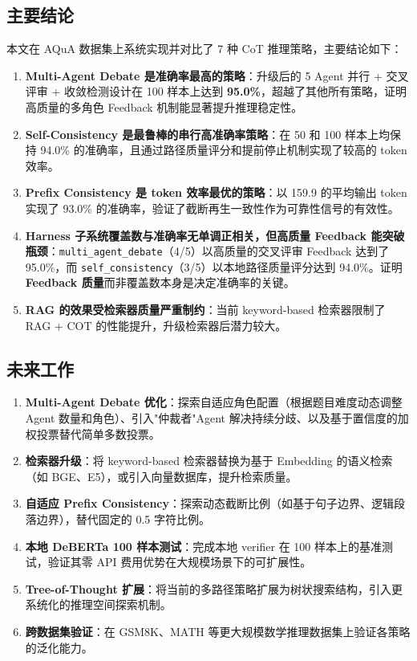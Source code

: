 \documentclass[lang=cn,a4paper,newtx]{elegantpaper}
\begin{document}
\subsection{主要结论}

本文在 AQuA 数据集上系统实现并对比了 7 种 CoT 推理策略，主要结论如下：

\begin{enumerate}
  \item \textbf{Multi-Agent Debate 是准确率最高的策略}：升级后的 5 Agent 并行 + 交叉评审 + 收敛检测设计在 100 样本上达到 \textbf{95.0\%}，超越了其他所有策略，证明高质量的多角色 Feedback 机制能显著提升推理稳定性。
  \item \textbf{Self-Consistency 是最鲁棒的串行高准确率策略}：在 50 和 100 样本上均保持 94.0\% 的准确率，且通过路径质量评分和提前停止机制实现了较高的 token 效率。
  \item \textbf{Prefix Consistency 是 token 效率最优的策略}：以 159.9 的平均输出 token 实现了 93.0\% 的准确率，验证了截断再生一致性作为可靠性信号的有效性。
  \item \textbf{Harness 子系统覆盖数与准确率无单调正相关，但高质量 Feedback 能突破瓶颈}：\texttt{multi\_agent\_debate}（4/5）以高质量的交叉评审 Feedback 达到了 95.0\%，而 \texttt{self\_consistency}（3/5）以本地路径质量评分达到 94.0\%。证明\textbf{Feedback 质量}而非覆盖数本身是决定准确率的关键。
  \item \textbf{RAG 的效果受检索器质量严重制约}：当前 keyword-based 检索器限制了 RAG + COT 的性能提升，升级检索器后潜力较大。
\end{enumerate}

\subsection{未来工作}

\begin{enumerate}
  \item \textbf{Multi-Agent Debate 优化}：探索自适应角色配置（根据题目难度动态调整 Agent 数量和角色）、引入"仲裁者"Agent 解决持续分歧、以及基于置信度的加权投票替代简单多数投票。
  \item \textbf{检索器升级}：将 keyword-based 检索器替换为基于 Embedding 的语义检索（如 BGE、E5），或引入向量数据库，提升检索质量。
  \item \textbf{自适应 Prefix Consistency}：探索动态截断比例（如基于句子边界、逻辑段落边界），替代固定的 0.5 字符比例。
  \item \textbf{本地 DeBERTa 100 样本测试}：完成本地 verifier 在 100 样本上的基准测试，验证其零 API 费用优势在大规模场景下的可扩展性。
  \item \textbf{Tree-of-Thought 扩展}：将当前的多路径策略扩展为树状搜索结构，引入更系统化的推理空间探索机制。
  \item \textbf{跨数据集验证}：在 GSM8K、MATH 等更大规模数学推理数据集上验证各策略的泛化能力。
\end{enumerate}

\nocite{*}
\printbibliography[heading=bibintoc, title=\ebibname]
\end{document}

